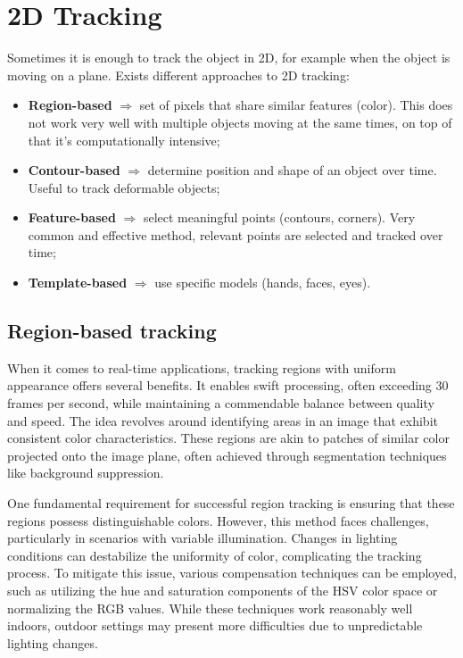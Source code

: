 \section{2D Tracking}
Sometimes it is enough to track the object in 2D, for example when the object is moving on a plane.
Exists different approaches to 2D tracking:
\begin{itemize}
\item \textbf{Region-based} $\Rightarrow$ set of pixels that share similar features (color). This does not work very well with multiple objects moving at the same times, on top of that it's computationally intensive;
\item \textbf{Contour-based} $\Rightarrow$ determine position and shape of an object over time. Useful to track deformable objects;
\item \textbf{Feature-based} $\Rightarrow$ select meaningful points (contours, corners). Very common and effective method, relevant points are selected and tracked over time;
\item \textbf{Template-based} $\Rightarrow$ use specific models (hands, faces, eyes).
\end{itemize}

\subsection{Region-based tracking}
When it comes to real-time applications, tracking regions with uniform appearance offers several benefits. 
It enables swift processing, often exceeding 30 frames per second, while maintaining a commendable balance between quality and speed. 
The idea revolves around identifying areas in an image that exhibit consistent color characteristics. 
These regions are akin to patches of similar color projected onto the image plane, often achieved through segmentation techniques like background suppression.

One fundamental requirement for successful region tracking is ensuring that these regions possess distinguishable colors. 
However, this method faces challenges, particularly in scenarios with variable illumination. 
Changes in lighting conditions can destabilize the uniformity of color, complicating the tracking process. 
To mitigate this issue, various compensation techniques can be employed, such as utilizing the hue and saturation components of the HSV color space or normalizing the RGB values. 
While these techniques work reasonably well indoors, outdoor settings may present more difficulties due to unpredictable lighting changes.

